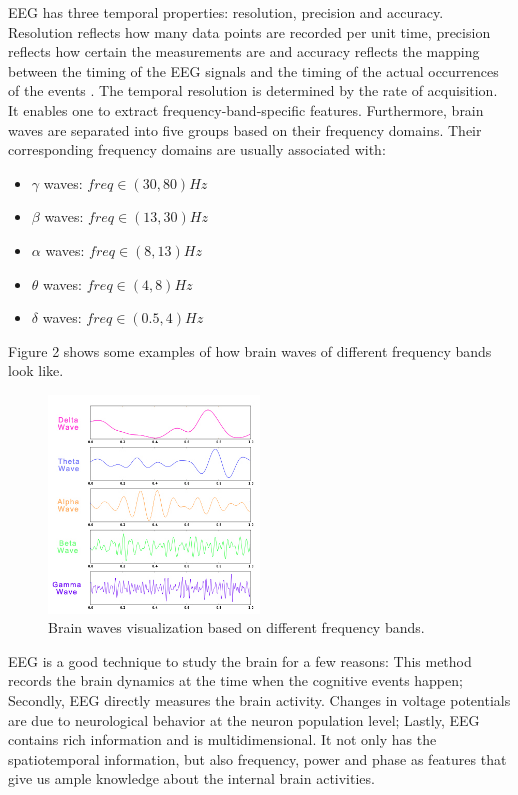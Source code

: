 \documentclass[a4paper,11pt,oneside]{article}
\begin{document}
EEG has three temporal properties: resolution, precision and accuracy. Resolution reflects how many  data points are recorded per unit time, precision reflects how certain the measurements are and accuracy reflects the mapping between the timing of the EEG signals and the timing of the actual occurrences of the events \cite{cohen2014analyzing}. The temporal resolution is determined by the rate of acquisition. It enables one to extract frequency-band-specific features. Furthermore, brain waves are separated into five groups based on their frequency domains. Their corresponding frequency domains are usually associated with:
\begin{itemize}
	\item $  \gamma $ waves: $freq \in (30, 80) Hz$
	\item $ \beta $ waves: $freq \in (13, 30) Hz$
	\item $ \alpha $ waves: $freq \in (8, 13) Hz$
	\item $ \theta $ waves: $freq \in (4, 8) Hz$
	\item $ \delta $ waves: $freq \in (0.5, 4) Hz$
\end{itemize}
Figure 2 shows some examples of how brain waves of different frequency bands look like.
\begin{figure}[h]
	\centering
	\includegraphics[width=0.5\textwidth]{img/waves}
	\caption[Caption for LOF]{Brain waves visualization based on different frequency bands.\footnotemark}
\end{figure}
EEG is a good technique to study the brain for a few reasons: This method records the brain dynamics at the time when the cognitive events happen; Secondly, EEG directly measures the brain activity. Changes in voltage potentials are due to neurological behavior at the neuron population level; Lastly, EEG contains rich information and is multidimensional. It not only has the spatiotemporal information, but also frequency, power and phase as features that give us ample knowledge about the internal brain activities. \cite{cohen2011s}
\end{document}
